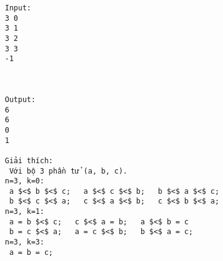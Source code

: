 \begin{verbatim}
Input:
3 0
3 1
3 2
3 3
-1



Output:
6
6
0
1

Giải thích:
 Với bộ 3 phần tử (a, b, c). 
n=3, k=0:
 a $<$ b $<$ c;   a $<$ c $<$ b;   b $<$ a $<$ c; 
 b $<$ c $<$ a;   c $<$ a $<$ b;   c $<$ b $<$ a;
n=3, k=1:
 a = b $<$ c;   c $<$ a = b;   a $<$ b = c
 b = c $<$ a;   a = c $<$ b;   b $<$ a = c;
n=3, k=3:
 a = b = c; 

\end{verbatim}